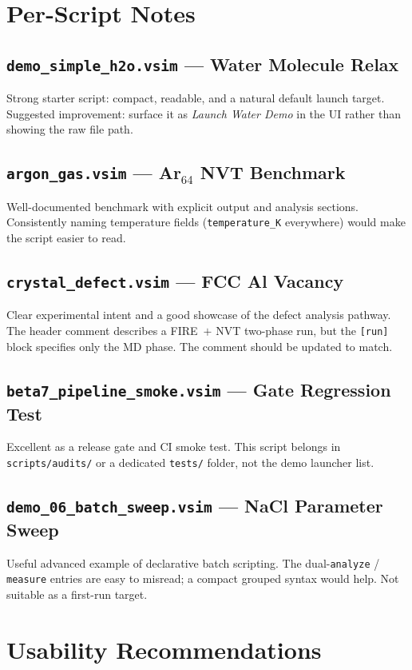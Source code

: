 \documentclass[10pt,a4paper]{article}
\begin{document}
\section*{Per-Script Notes}

\subsection*{\texttt{demo\_simple\_h2o.vsim} --- Water Molecule Relax}
Strong starter script: compact, readable, and a natural default launch target.
Suggested improvement: surface it as \emph{Launch Water Demo} in the UI rather
than showing the raw file path.

\subsection*{\texttt{argon\_gas.vsim} --- Ar$_{64}$ NVT Benchmark}
Well-documented benchmark with explicit output and analysis sections.
Consistently naming temperature fields (\texttt{temperature\_K} everywhere)
would make the script easier to read.

\subsection*{\texttt{crystal\_defect.vsim} --- FCC Al Vacancy}
Clear experimental intent and a good showcase of the defect analysis pathway.
The header comment describes a FIRE~$+$ NVT two-phase run, but the \texttt{[run]}
block specifies only the MD phase. The comment should be updated to match.

\subsection*{\texttt{beta7\_pipeline\_smoke.vsim} --- Gate Regression Test}
Excellent as a release gate and CI smoke test.
This script belongs in \texttt{scripts/audits/} or a dedicated \texttt{tests/}
folder, not the demo launcher list.

\subsection*{\texttt{demo\_06\_batch\_sweep.vsim} --- NaCl Parameter Sweep}
Useful advanced example of declarative batch scripting.
The dual-\texttt{analyze} / \texttt{measure} entries are easy to misread;
a compact grouped syntax would help. Not suitable as a first-run target.

\section*{Usability Recommendations}
\end{document}
